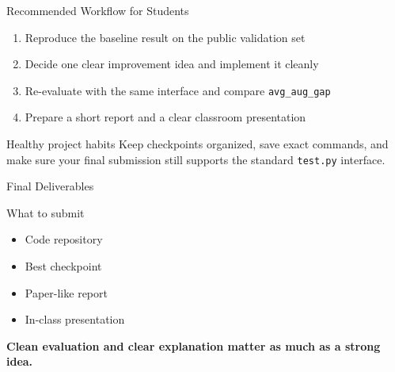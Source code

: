 \documentclass[aspectratio=169,11pt]{beamer}
\begin{document}
\begin{frame}{Recommended Workflow for Students}
  \begin{enumerate}
    \item Reproduce the baseline result on the public validation set
    \item Decide one clear improvement idea and implement it cleanly
    \item Re-evaluate with the same interface and compare \texttt{avg\_aug\_gap}
    \item Prepare a short report and a clear classroom presentation
  \end{enumerate}

  \vspace{0.4cm}
  \begin{block}{Healthy project habits}
    Keep checkpoints organized, save exact commands, and make sure your final submission still supports the standard \texttt{test.py} interface.
  \end{block}
\end{frame}

\begin{frame}{Final Deliverables}
  \begin{block}{What to submit}
    \begin{itemize}
      \item Code repository
      \item Best checkpoint
      \item Paper-like report
      \item In-class presentation
    \end{itemize}
  \end{block}

  \vspace{0.3cm}
  \centering
  {\Large\color{sdmblue}\textbf{Clean evaluation and clear explanation matter as much as a strong idea.}}
\end{frame}
\end{document}
